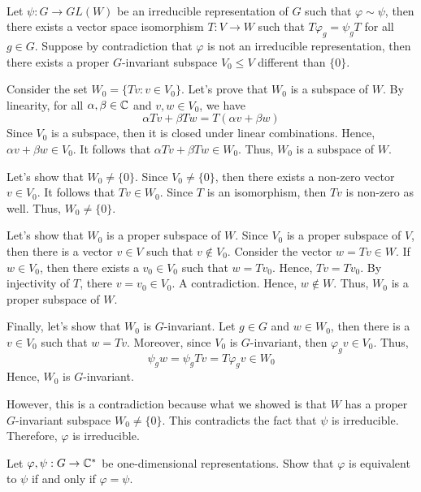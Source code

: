 \begin{solution}
    \\ Let $\psi : G \to GL(W)$ be an irreducible representation of $G$ such that $\varphi \sim \psi$, then there exists a vector space isomorphism $T : V \to W$ such that $T \varphi_g = \psi_g T$ for all $g \in G$. Suppose by contradiction that $\varphi$ is not an irreducible representation, then there exists a proper $G$-invariant subspace $V_0 \leq V$ different than $\{0\}$.

    Consider the set $W_0 = \{Tv : v \in V_0\}$. Let's prove that $W_0$ is a subspace of $W$. By linearity, for all $\alpha, \beta \in \mathbb{C}$ and $v,w \in V_0$, we have
    $$\alpha Tv + \beta Tw = T(\alpha v + \beta w)$$
    Since $V_0$ is a subspace, then it is closed under linear combinations. Hence, $\alpha v + \beta w  \in V_0$. It follows that $\alpha Tv + \beta Tw \in W_0$. Thus, $W_0$ is a subspace of $W$.

    Let's show that $W_0 \neq \{0\}$. Since $V_0 \neq \{0\}$, then there exists a non-zero vector $v \in V_0$. It follows that $Tv \in W_0$. Since $T$ is an isomorphism, then $Tv$ is non-zero as well. Thus, $W_0 \neq \{0\}$.

    Let's show that $W_0$ is a proper subspace of $W$. Since $V_0$ is a proper subspace of $V$, then there is a vector $v \in V$ such that $v \notin V_0$. Consider the vector $w = Tv \in W$. If $w \in V_0$, then there exists a $v_0 \in V_0$ such that $w = Tv_0$. Hence, $Tv = Tv_0$. By injectivity of $T$, there $v = v_0 \in V_0$. A contradiction. Hence, $w \notin W$. Thus, $W_0$ is a proper subspace of $W$.

    Finally, let's show that $W_0$ is $G$-invariant. Let $g \in G$ and $w \in W_0$, then there is a $v \in V_0$ such that $w = Tv$. Moreover, since $V_0$ is $G$-invariant, then $\varphi_g v \in V_0$. Thus,
    $$\psi_g w = \psi_g T v = T \varphi_g v \in W_0$$
    Hence, $W_0$ is $G$-invariant.

    However, this is a contradiction because what we showed is that $W$ has a proper $G$-invariant subspace $W_0 \neq \{0\}$. This contradicts the fact that $\psi$ is irreducible. Therefore, $\varphi$ is irreducible. \\
\end{solution}

\begin{exercise}
    Let $\varphi, \psi : G \to \mathbb{C}^*$ be one-dimensional representations. Show that $\varphi$ is equivalent to $\psi$ if and only if $\varphi = \psi$. \\
\end{exercise}

